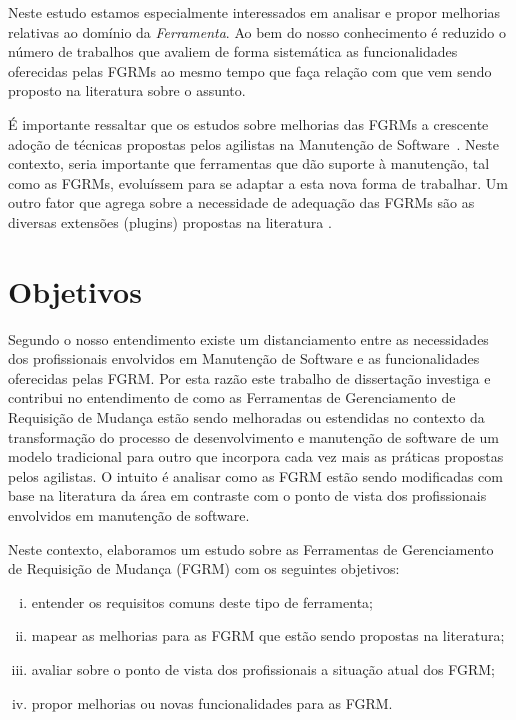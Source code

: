 Neste estudo estamos especialmente interessados em analisar e propor melhorias
relativas ao domínio da \textit{Ferramenta}. Ao bem do nosso conhecimento é
reduzido o número de trabalhos que avaliem de forma sistemática as
funcionalidades oferecidas pelas FGRMs ao mesmo tempo que faça relação com que
vem sendo proposto na li\-te\-ra\-tu\-ra sobre o assunto.

É importante ressaltar que os estudos sobre melhorias das FGRMs a crescente
adoção de técnicas propostas pelos agilistas na Manutenção de
Software~\cite{Soltan2016,Devulapally2015, Heeager2015}. Neste contexto, seria
importante que ferramentas que dão suporte à manutenção, tal como as FGRMs,
evoluíssem para se adaptar a esta nova forma de trabalhar. Um outro fator que
agrega sobre a necessidade de adequação das FGRMs são as diversas extensões
(plugins) propostas na literatura
\cite{101186,Thung:2014:BIT:2635868.2661678,Kononenko:2014:DED:2591062.2591075}.

\section{Objetivos}
\label{sec:intro-objetivos}

Segundo o nosso entendimento existe um distanciamento entre as necessidades dos
profissionais envolvidos em Manutenção de Software e as funcionalidades
oferecidas pelas FGRM\@. Por esta razão este trabalho de dissertação investiga e
contribui no entendimento de como as Ferramentas de Gerenciamento de Requisição
de Mudança estão sendo melhoradas ou estendidas no contexto da transformação do
processo de desenvolvimento e manutenção de software de um modelo tradicional
para outro que incorpora cada vez mais as práticas propostas pelos agilistas. O
intuito é analisar como as FGRM estão sendo modificadas com base na literatura
da área em contraste com o ponto de vista dos profissionais envolvidos em
manutenção de software.

Neste contexto, elaboramos um estudo sobre as Ferramentas de Gerenciamento de
Requisição de Mudança (FGRM) com os seguintes objetivos:
\begin{enumerate}[(i)]
	\item entender os requisitos comuns deste tipo de ferramenta;
	\item mapear as melhorias para as FGRM que estão sendo propostas na
		literatura;
	\item avaliar sobre o ponto de vista dos profissionais a
		situação atual dos FGRM\@;
	\item propor melhorias ou novas funcionalidades para as FGRM\@.
\end{enumerate}

